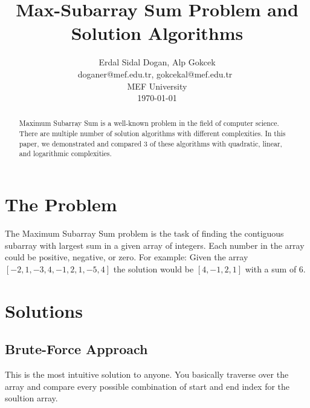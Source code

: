 \documentclass[twocolumns]{IEEEtran}
\author{Erdal Sidal Dogan, Alp Gokcek \\doganer@mef.edu.tr, gokcekal@mef.edu.tr \\ MEF University \\ \today}
\title{Max-Subarray Sum Problem and Solution Algorithms}
\begin{document}
	\maketitle
	\begin{abstract}
		Maximum Subarray Sum is a well-known problem in the field of computer science. There are multiple number of solution algorithms with different complexities. In this paper, we demonstrated and compared 3 of these algorithms with quadratic, linear, and logarithmic complexities.
	\end{abstract}
\section{The Problem}
The Maximum Subarray Sum problem is the task of finding the contiguous subarray with largest sum in a given array of integers. Each number in the array could be positive, negative, or zero. For example: Given the array $[-2, 1, -3, 4, -1, 2, 1, -5, 4]$ the solution would be $[4, -1, 2, 1]$ with a sum of 6.
\section{Solutions}
\subsection{Brute-Force Approach}
This is the most intuitive solution to anyone. You basically traverse over the array and compare every possible combination of start and end index for the soultion array.\\ \\
\end{document}
